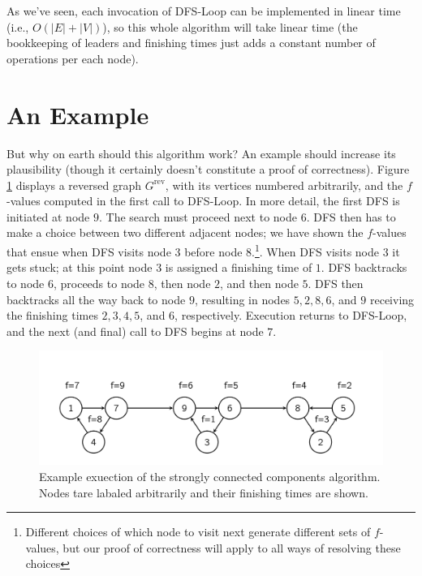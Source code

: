 \documentclass [12pt]{article}
\theoremstyle{definition}
\begin{document}
As we've seen, each invocation of DFS-Loop can be implemented in linear time (i.e., $O(|E|+ |V |)$), so this whole algorithm will take linear time (the bookkeeping of leaders and finishing times just adds a constant number of operations per each node).

\section{An Example}
 
But why on earth should this algorithm work? An example should increase its plausibility (though it certainly doesn't constitute a proof of correctness). Figure \ref{fig:g_rev_scc} displays a reversed graph $G^{\text{rev}}$, with its vertices numbered arbitrarily, and the $f$-values computed in the first call to DFS-Loop. In more detail, the first DFS is initiated at node $9$. The search must proceed next to node $6$. DFS then has to make a choice between two different adjacent nodes; we have shown the $f$-values that ensue when DFS visits node $3$ before node $8$.\footnote{Different choices of which node to visit next generate different sets of $f$-values, but our proof of correctness will apply to all ways of resolving these choices}. When DFS visits node $3$ it gets stuck; at this point node $3$ is assigned a finishing time of $1$. DFS backtracks to node $6$, proceeds to node $8$, then node $2$, and then node $5$. DFS then backtracks all the way back to node $9$, resulting in nodes $5, 2, 8, 6$, and $9$ receiving the finishing times $2, 3, 4, 5$, and $6$, respectively. Execution returns to DFS-Loop, and the next (and final) call to DFS begins at node $7$.

\begin{figure}[ht!]
\includegraphics[scale=0.8]{g_rev_scc.png}
\caption{Example exuection of the strongly connected components algorithm. Nodes tare labaled arbitrarily and their finishing times are shown.}
\label{fig:g_rev_scc}
\end{figure}
\end{document}
